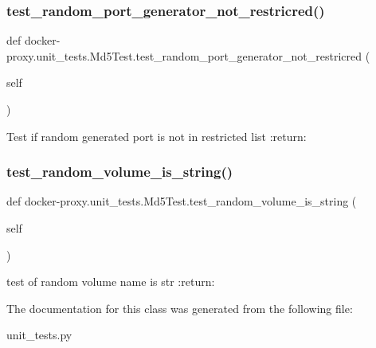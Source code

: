 \subsubsection{\texorpdfstring{test\+\_\+random\+\_\+port\+\_\+generator\+\_\+not\+\_\+restricred()}{test\_random\_port\_generator\_not\_restricred()}}
{\footnotesize\ttfamily def docker-\/proxy.\+unit\+\_\+tests.\+Md5\+Test.\+test\+\_\+random\+\_\+port\+\_\+generator\+\_\+not\+\_\+restricred (\begin{DoxyParamCaption}\item[{}]{self }\end{DoxyParamCaption})}

\begin{DoxyVerb}Test if random generated port is not in restricted list
:return:
\end{DoxyVerb}
 \mbox{\label{classdocker-proxy_1_1unit__tests_1_1_md5_test_a7a31a78746cfbad0c3d3a740f8ab50fd}} 
\subsubsection{\texorpdfstring{test\+\_\+random\+\_\+volume\+\_\+is\+\_\+string()}{test\_random\_volume\_is\_string()}}
{\footnotesize\ttfamily def docker-\/proxy.\+unit\+\_\+tests.\+Md5\+Test.\+test\+\_\+random\+\_\+volume\+\_\+is\+\_\+string (\begin{DoxyParamCaption}\item[{}]{self }\end{DoxyParamCaption})}

\begin{DoxyVerb}test of random volume name is str
:return:
\end{DoxyVerb}
 

The documentation for this class was generated from the following file\+:\begin{DoxyCompactItemize}
\item 
unit\+\_\+tests.\+py\end{DoxyCompactItemize}
